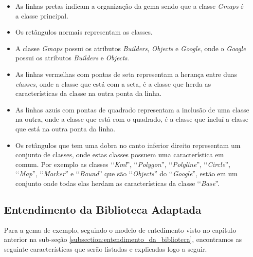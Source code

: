 \begin{itemize}

 \item As linhas pretas indicam a organização da gema sendo que a classe \emph{Gmaps} é a classe principal.
 
 \item Os retângulos normais representam as classes.
 
 \item A classe \emph{Gmaps} possui os atributos \emph{Builders}, \emph{Objects} e 
 \emph{Google}, onde o \emph{Google} possui os atributos \emph{Builders} e \emph{Objects}.
 
 \item As linhas vermelhas com pontas de seta representam a herança entre duas \emph{classes}, onde 
 a classe que está com a seta, é a classe que herda as características da classe
 na outra ponta da linha.

 \item As linhas azuis com pontas de quadrado representam a inclusão de uma classe na outra, onde
 a classe que está com o quadrado, é a classe que incluí a classe que está na outra ponta da linha.
 
  \item Os retângulos que tem uma dobra no canto inferior direito representam um conjunto de classes, 
 onde estas classes possuem uma característica em comum. Por exemplo as classes ‘‘\emph{Kml}'', 
 ‘‘\emph{Polygon}'', ‘‘\emph{Polyline}'', ‘‘\emph{Circle}'', ‘‘\emph{Map}'', ‘‘\emph{Marker}'' e 
 ‘‘\emph{Bound}'' que são ‘‘\emph{Objects}'' do ‘‘\emph{Google}'', estão em um conjunto onde todas elas 
 herdam as características da classe ‘‘\emph{Base}''.
 
 \end{itemize}


\subsection{Entendimento da Biblioteca Adaptada} 
\label{subsection:entendimento_da_biblioteca_adaptada}
 
 
Para a gema de exemplo, seguindo o modelo de entedimento visto no capítulo anterior na sub-seção
\ref{subsection:entendimento_da_biblioteca}, encontramos as seguinte características que serão
listadas e explicadas logo a seguir.

